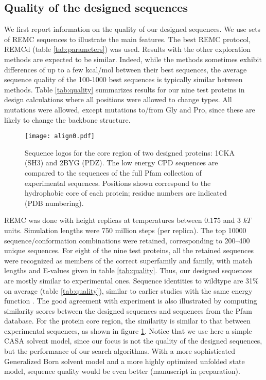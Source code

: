 \subsection{Quality of the designed sequences}
We first report information on the quality of our designed sequences. We use sets of REMC sequences to illustrate the main features. The best REMC protocol, REMCd (table \ref{tab:parameters}) was used. Results with the other exploration methods are expected to be similar. Indeed, while the methods sometimes exhibit differences of up to a few kcal/mol between their best sequences, the average sequence quality of the 100-1000 best sequences is typically similar between methods. Table \ref{tab:quality} summarizes results for our nine test proteins in design calculations where all positions were allowed to change types. All mutations were allowed, except mutations to/from Gly and Pro, since these are likely to change the backbone structure.
 
\begin{figure}[!htbp]
        \centering
  \texttt{[image: align0.pdf]} 
  \caption{
Sequence logos for the core region of two designed proteins: 1CKA (SH3) and 2BYG (PDZ). The low energy CPD sequences are compared to the sequences of the full Pfam collection of
experimental sequences. Positions shown correspond to the hydrophobic core of each protein; residue numbers are indicated (PDB numbering).
}
      \label{fig:logos}
\end{figure}

REMC was done with height replicas at temperatures between 0.175 and 3 $kT$ units. Simulation lengths were 750 million steps (per replica). The top 10000 sequence/conformation combinations were retained, corresponding to 200--400 unique sequences. For eight of the nine test proteins, all the retained sequences were recognized as members of the correct superfamily and family, with match lengths and E-values given in table \ref{tab:quality}. Thus, our designed sequences are mostly similar to experimental ones. Sequence identities to wildtype are 31\% on average (table \ref{tab:quality}), similar to earlier studies with the same energy function \cite{Schmidt09,Schmidt10}. The good agreement with experiment is also illustrated by computing similarity scores between the designed sequences and sequences from the Pfam database. For the protein core region, the similarity is similar to that between experimental sequences, as shown in figure \ref{fig:logos}. Notice that we use here a simple CASA solvent model, since our focus is not the quality of the designed sequences, but the performance of our search algorithms. With a more sophisticated Generalized Born solvent model and a more highly optimized unfolded state model, sequence quality would be even better (manuscript in preparation).

